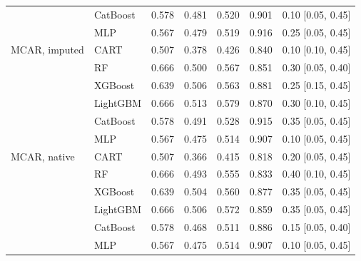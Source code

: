 \begin{table}[p]
\begin{tabular}{@{}llrrrrl@{}}
 & CatBoost & 0.578 & 0.481 & 0.520 & 0.901 & 0.10 [0.05, 0.45] \\
 & MLP & 0.567 & 0.479 & 0.519 & 0.916 & 0.25 [0.05, 0.45] \\
\midrule
MCAR, imputed & CART & 0.507 & 0.378 & 0.426 & 0.840 & 0.10 [0.10, 0.45] \\
 & RF & 0.666 & 0.500 & 0.567 & 0.851 & 0.30 [0.05, 0.40] \\
 & XGBoost & 0.639 & 0.506 & 0.563 & 0.881 & 0.25 [0.15, 0.45] \\
 & LightGBM & 0.666 & 0.513 & 0.579 & 0.870 & 0.30 [0.10, 0.45] \\
 & CatBoost & 0.578 & 0.491 & 0.528 & 0.915 & 0.35 [0.05, 0.45] \\
 & MLP & 0.567 & 0.475 & 0.514 & 0.907 & 0.10 [0.05, 0.45] \\
\midrule
MCAR, native & CART & 0.507 & 0.366 & 0.415 & 0.818 & 0.20 [0.05, 0.45] \\
 & RF & 0.666 & 0.493 & 0.555 & 0.833 & 0.40 [0.10, 0.45] \\
 & XGBoost & 0.639 & 0.504 & 0.560 & 0.877 & 0.35 [0.05, 0.45] \\
 & LightGBM & 0.666 & 0.506 & 0.572 & 0.859 & 0.35 [0.05, 0.45] \\
 & CatBoost & 0.578 & 0.468 & 0.511 & 0.886 & 0.15 [0.05, 0.40] \\
 & MLP & 0.567 & 0.475 & 0.514 & 0.907 & 0.10 [0.05, 0.45] \\
\bottomrule
\end{tabular}
\end{table}

